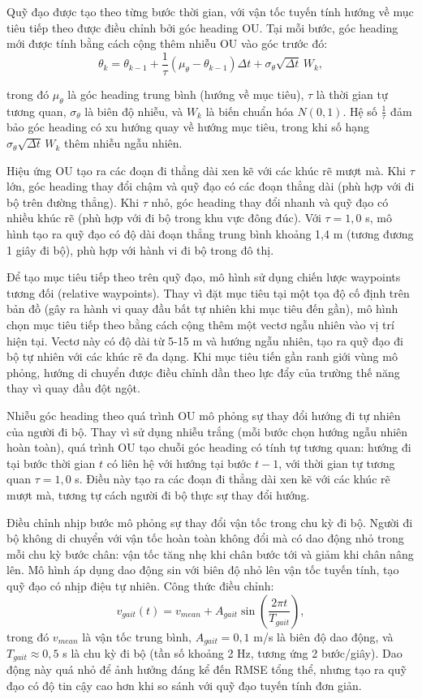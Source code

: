 Quỹ đạo được tạo theo từng bước thời gian, với vận tốc tuyến tính hướng về mục tiêu tiếp theo được điều chỉnh bởi góc heading OU. Tại mỗi bước, góc heading mới được tính bằng cách cộng thêm nhiễu OU vào góc trước đó:
\begin{equation}
\theta_k = \theta_{k-1} + \frac{1}{\tau}\left(\mu_\theta - \theta_{k-1}\right)\Delta t + \sigma_\theta \sqrt{\Delta t}\, W_k,
\end{equation}

trong đó $\mu_\theta$ là góc heading trung bình (hướng về mục tiêu), $\tau$ là thời gian tự tương quan, $\sigma_\theta$ là biên độ nhiễu, và $W_k$ là biến chuẩn hóa $N(0,1)$. Hệ số $\frac{1}{\tau}$ đảm bảo góc heading có xu hướng quay về hướng mục tiêu, trong khi số hạng $\sigma_\theta \sqrt{\Delta t}\, W_k$ thêm nhiễu ngẫu nhiên.

Hiệu ứng OU tạo ra các đoạn đi thẳng dài xen kẽ với các khúc rẽ mượt mà. Khi $\tau$ lớn, góc heading thay đổi chậm và quỹ đạo có các đoạn thẳng dài (phù hợp với đi bộ trên đường thẳng). Khi $\tau$ nhỏ, góc heading thay đổi nhanh và quỹ đạo có nhiều khúc rẽ (phù hợp với đi bộ trong khu vực đông đúc). Với $\tau = 1{,}0$ s, mô hình tạo ra quỹ đạo có độ dài đoạn thẳng trung bình khoảng 1,4 m (tương đương 1 giây đi bộ), phù hợp với hành vi đi bộ trong đô thị.

Để tạo mục tiêu tiếp theo trên quỹ đạo, mô hình sử dụng chiến lược waypoints tương đối (relative waypoints). Thay vì đặt mục tiêu tại một tọa độ cố định trên bản đồ (gây ra hành vi quay đầu bất tự nhiên khi mục tiêu đến gần), mô hình chọn mục tiêu tiếp theo bằng cách cộng thêm một vectơ ngẫu nhiên vào vị trí hiện tại. Vectơ này có độ dài từ 5-15 m và hướng ngẫu nhiên, tạo ra quỹ đạo đi bộ tự nhiên với các khúc rẽ đa dạng. Khi mục tiêu tiến gần ranh giới vùng mô phỏng, hướng di chuyển được điều chỉnh dần theo lực đẩy của trường thế năng thay vì quay đầu đột ngột.

Nhiễu góc heading theo quá trình OU mô phỏng sự thay đổi hướng đi tự nhiên của người đi bộ. Thay vì sử dụng nhiễu trắng (mỗi bước chọn hướng ngẫu nhiên hoàn toàn), quá trình OU tạo chuỗi góc heading có tính tự tương quan: hướng đi tại bước thời gian $t$ có liên hệ với hướng tại bước $t-1$, với thời gian tự tương quan $\tau = 1{,}0$ s. Điều này tạo ra các đoạn đi thẳng dài xen kẽ với các khúc rẽ mượt mà, tương tự cách người đi bộ thực sự thay đổi hướng.

Điều chỉnh nhịp bước mô phỏng sự thay đổi vận tốc trong chu kỳ đi bộ. Người đi bộ không di chuyển với vận tốc hoàn toàn không đổi mà có dao động nhỏ trong mỗi chu kỳ bước chân: vận tốc tăng nhẹ khi chân bước tới và giảm khi chân nâng lên. Mô hình áp dụng dao động sin với biên độ nhỏ lên vận tốc tuyến tính, tạo quỹ đạo có nhịp điệu tự nhiên. Công thức điều chỉnh:
\begin{equation}
v_{gait}(t) = v_{mean} + A_{gait} \sin\left(\frac{2\pi t}{T_{gait}}\right),
\end{equation}
trong đó $v_{mean}$ là vận tốc trung bình, $A_{gait} = 0{,}1$ m/s là biên độ dao động, và $T_{gait} \approx 0{,}5$ s là chu kỳ đi bộ (tần số khoảng 2 Hz, tương ứng 2 bước/giây). Dao động này quá nhỏ để ảnh hưởng đáng kể đến RMSE tổng thể, nhưng tạo ra quỹ đạo có độ tin cậy cao hơn khi so sánh với quỹ đạo tuyến tính đơn giản.

